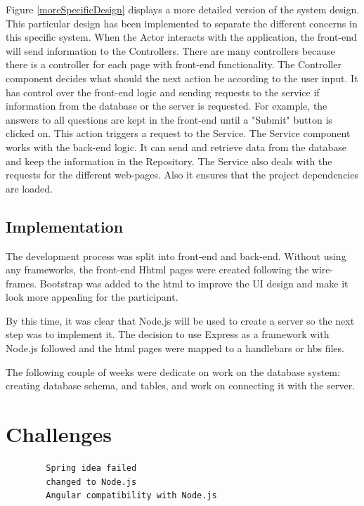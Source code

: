 \documentclass{l4proj}
\begin{document}
Figure \ref{moreSpecificDesign} displays a more detailed version of the system design. This particular design has been implemented to separate the different concerns in this specific system. When the Actor interacts with the application, the front-end will send information to the Controllers. There are many controllers because there is a controller for each page with front-end functionality. The Controller component decides what should the next action be according to the user input. It has control over the front-end logic and sending requests to the service if information from the database or the server is requested. For example, the answers to all questions are kept in the front-end until a "Submit" button is clicked on. This action triggers a request to the Service. The Service component works with the back-end logic. It can send and retrieve data from the database and keep the information in the Repository. The Service also deals with the requests for the different web-pages. Also it ensures that the project dependencies are loaded.   

\subsection{Implementation}
The development process was split into front-end and back-end. Without using any frameworks, the front-end Hhtml pages were created following the wire-frames. Bootstrap was added to the html to improve the UI design and make it look more appealing for the participant. 

By this time, it was clear that Node.js will be used to create a server so the next step was to implement it. The decision to use Express as a framework with Node.js followed and the html pages were mapped to a handlebars or hbs files. 

The following couple of weeks were dedicate on work on the database system: creating database schema, and tables, and work on connecting it with the server. 

\section{Challenges}
\begin{verbatim}
		Spring idea failed
		changed to Node.js
		Angular compatibility with Node.js
\end{verbatim}
\end{document}
